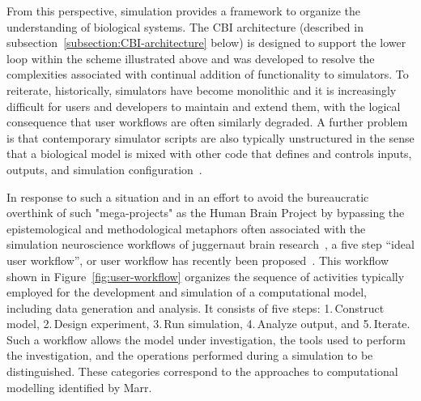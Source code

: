\documentclass{article}
\begin{document}
From this perspective, simulation provides a framework to organize the understanding of biological systems. The CBI architecture (described in subsection~\ref{subsection:CBI-architecture} below) is designed to support the lower loop within the scheme illustrated above and was developed to resolve the complexities associated with continual addition of functionality to simulators. To reiterate, historically, simulators have become monolithic and it is increasingly difficult for users and developers to maintain and extend them, with the logical consequence that user workflows are often similarly degraded. A further problem is that contemporary simulator scripts are also typically unstructured in the sense that a biological model is mixed with other code that defines and controls inputs, outputs, and simulation configuration~\cite{cannon07:_inter}.

In response to such a situation and in an effort to avoid the bureaucratic overthink of such "mega-projects" as the Human Brain Project by bypassing the epistemological and methodological metaphors often associated with the simulation neuroscience workflows of juggernaut brain research~\cite{fan19}, a five step “ideal user workflow”, or user workflow has recently been proposed~\cite{10.1371/journal.pone.0028956}.  This workflow shown in Figure~\ref{fig:user-workflow} organizes the sequence of activities typically employed for the development and simulation of a computational model, including data generation and analysis.  It consists of five steps: 1.\,Construct model, 2.\,Design experiment, 3.\,Run simulation, 4.\,Analyze output, and 5.\,Iterate.  Such a workflow allows the model under investigation, the tools used to perform the investigation, and the operations performed during a simulation to be distinguished. These categories correspond to the approaches to computational modelling identified by Marr.  
\end{document}
